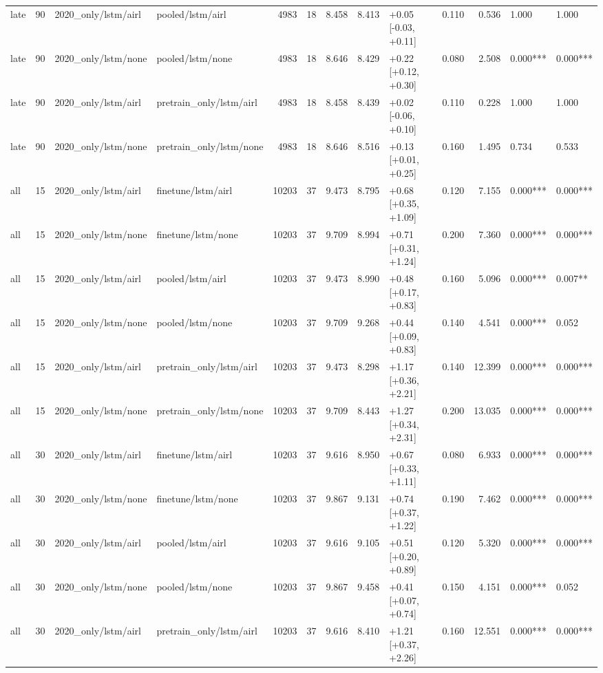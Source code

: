 \begin{tabular}{lrllrrrrlrrll}
late & 90 & 2020_only/lstm/airl & pooled/lstm/airl & 4983 & 18 & 8.458 & 8.413 & +0.05 [-0.03, +0.11] & 0.110 & 0.536 & 1.000 & 1.000 \\
late & 90 & 2020_only/lstm/none & pooled/lstm/none & 4983 & 18 & 8.646 & 8.429 & +0.22 [+0.12, +0.30] & 0.080 & 2.508 & 0.000*** & 0.000*** \\
late & 90 & 2020_only/lstm/airl & pretrain_only/lstm/airl & 4983 & 18 & 8.458 & 8.439 & +0.02 [-0.06, +0.10] & 0.110 & 0.228 & 1.000 & 1.000 \\
late & 90 & 2020_only/lstm/none & pretrain_only/lstm/none & 4983 & 18 & 8.646 & 8.516 & +0.13 [+0.01, +0.25] & 0.160 & 1.495 & 0.734 & 0.533 \\
all & 15 & 2020_only/lstm/airl & finetune/lstm/airl & 10203 & 37 & 9.473 & 8.795 & +0.68 [+0.35, +1.09] & 0.120 & 7.155 & 0.000*** & 0.000*** \\
all & 15 & 2020_only/lstm/none & finetune/lstm/none & 10203 & 37 & 9.709 & 8.994 & +0.71 [+0.31, +1.24] & 0.200 & 7.360 & 0.000*** & 0.000*** \\
all & 15 & 2020_only/lstm/airl & pooled/lstm/airl & 10203 & 37 & 9.473 & 8.990 & +0.48 [+0.17, +0.83] & 0.160 & 5.096 & 0.000*** & 0.007** \\
all & 15 & 2020_only/lstm/none & pooled/lstm/none & 10203 & 37 & 9.709 & 9.268 & +0.44 [+0.09, +0.83] & 0.140 & 4.541 & 0.000*** & 0.052 \\
all & 15 & 2020_only/lstm/airl & pretrain_only/lstm/airl & 10203 & 37 & 9.473 & 8.298 & +1.17 [+0.36, +2.21] & 0.140 & 12.399 & 0.000*** & 0.000*** \\
all & 15 & 2020_only/lstm/none & pretrain_only/lstm/none & 10203 & 37 & 9.709 & 8.443 & +1.27 [+0.34, +2.31] & 0.200 & 13.035 & 0.000*** & 0.000*** \\
all & 30 & 2020_only/lstm/airl & finetune/lstm/airl & 10203 & 37 & 9.616 & 8.950 & +0.67 [+0.33, +1.11] & 0.080 & 6.933 & 0.000*** & 0.000*** \\
all & 30 & 2020_only/lstm/none & finetune/lstm/none & 10203 & 37 & 9.867 & 9.131 & +0.74 [+0.37, +1.22] & 0.190 & 7.462 & 0.000*** & 0.000*** \\
all & 30 & 2020_only/lstm/airl & pooled/lstm/airl & 10203 & 37 & 9.616 & 9.105 & +0.51 [+0.20, +0.89] & 0.120 & 5.320 & 0.000*** & 0.000*** \\
all & 30 & 2020_only/lstm/none & pooled/lstm/none & 10203 & 37 & 9.867 & 9.458 & +0.41 [+0.07, +0.74] & 0.150 & 4.151 & 0.000*** & 0.052 \\
all & 30 & 2020_only/lstm/airl & pretrain_only/lstm/airl & 10203 & 37 & 9.616 & 8.410 & +1.21 [+0.37, +2.26] & 0.160 & 12.551 & 0.000*** & 0.000*** \\

\end{tabular}
